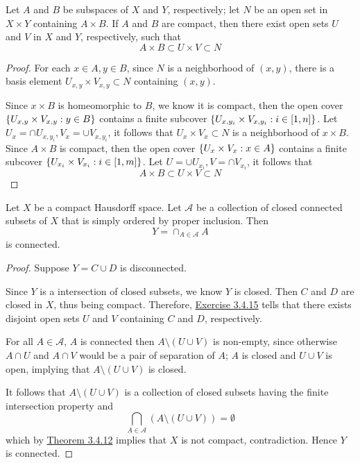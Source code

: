 \documentclass[12pt,a4paper]{article}
\begin{document}
    \begin{ex}
        Let $A$ and $B$ be subspaces of $X$ and $Y$, respectively; let $N$ be an open set in $X\times Y$ containing $A\times B$. If $A$ and $B$ are compact, then there exist open sets $U$ and $V$ in $X$ and $Y$, respectively, such that 
        $$
        A\times B\subset U\times V\subset N
        $$
    \end{ex}
    \begin{proof}
        For each $x\in A,y\in B$, since $N$ is a neighborhood of $(x,y)$, there is a basis element $U_{x,y}\times V_{x,y}\subset N$ containing $(x,y)$.
        
        Since $x\times B$ is homeomorphic to $B$, we know it is compact, then the open cover $\left\{U_{x,y}\times V_{x,y}:y\in B\right\}$ contains a finite subcover $\left\{U_{x,y_i}\times V_{x,y_i}:i\in[1,n]\right\}$. Let $U_x=\cap U_{x,y_i}, V_x=\cup V_{x,y_i}$, it follows that $U_x\times V_x\subset N$ is a neighborhood of $x\times B$. Since $A\times B$ is compact, then the open cover $\left\{U_x\times V_x:x\in A\right\}$ contains a finite subcover $\left\{U_{x_i}\times V_{x_i}:i\in[1,m]\right\}$. Let $U=\cup U_{x_i},V=\cap V_{x_i}$, it follows that
        $$
        A\times B\subset U\times V\subset N
        $$
    \end{proof}
    \hfill

    \begin{ex}\label{3.4.19}
        Let $X$ be a compact Hausdorff space. Let $\mathcal{A}$ be a collection of closed connected subsets of $X$ that is simply ordered by proper inclusion. Then
        $$
        Y=\cap_{A\in\mathcal{A}}A
        $$
        is connected.
    \end{ex}
    \begin{proof}
        Suppose $Y=C\cup D$ is disconnected. 

        Since $Y$ is a intersection of closed subsets, we know $Y$ is closed. Then $C$ and $D$ are closed in $X$, thus being compact. Therefore, \hyperref[3.4.15]{Exercise 3.4.15} tells that there exists disjoint open sets $U$ and $V$ containing $C$ and $D$, respectively.        
        
        For all $A\in\mathcal{A}$, $A$ is connected then $A\setminus(U\cup V)$ is non-empty, since otherwise $A\cap U$ and $A\cap V$ would be a pair of separation of $A$; $A$ is closed and $U\cup V$ is open, implying that $A\setminus(U\cup V)$ is closed. 

        It follows that $A\setminus(U\cup V)$ is a collection of closed subsets having the finite intersection property and
        $$
        \bigcap_{A\in\mathcal{A}}(A\setminus(U\cup V))=\emptyset
        $$
        which by \hyperref[3.4.12]{Theorem 3.4.12} implies that $X$ is not compact, contradiction. Hence $Y$ is connected.  
    \end{proof}
    \hfill
\end{document}
